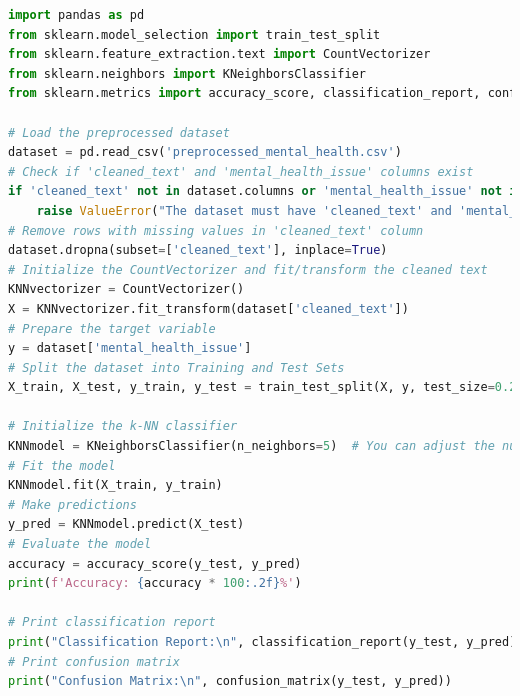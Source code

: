 \begin{tcolorbox}[colback=gray!5!white, colframe=gray!80!black, boxrule=0.5pt, title=k-NN Classifier Implementation for Mental Health Classification]
    \begin{lstlisting}[language=Python]
import pandas as pd
from sklearn.model_selection import train_test_split
from sklearn.feature_extraction.text import CountVectorizer
from sklearn.neighbors import KNeighborsClassifier
from sklearn.metrics import accuracy_score, classification_report, confusion_matrix

# Load the preprocessed dataset
dataset = pd.read_csv('preprocessed_mental_health.csv')
# Check if 'cleaned_text' and 'mental_health_issue' columns exist
if 'cleaned_text' not in dataset.columns or 'mental_health_issue' not in dataset.columns:
    raise ValueError("The dataset must have 'cleaned_text' and 'mental_health_issue' columns.")
# Remove rows with missing values in 'cleaned_text' column
dataset.dropna(subset=['cleaned_text'], inplace=True)
# Initialize the CountVectorizer and fit/transform the cleaned text
KNNvectorizer = CountVectorizer()
X = KNNvectorizer.fit_transform(dataset['cleaned_text'])
# Prepare the target variable
y = dataset['mental_health_issue']
# Split the dataset into Training and Test Sets
X_train, X_test, y_train, y_test = train_test_split(X, y, test_size=0.2, random_state=42)

# Initialize the k-NN classifier
KNNmodel = KNeighborsClassifier(n_neighbors=5)  # You can adjust the number of neighbors
# Fit the model
KNNmodel.fit(X_train, y_train)
# Make predictions
y_pred = KNNmodel.predict(X_test)
# Evaluate the model
accuracy = accuracy_score(y_test, y_pred)
print(f'Accuracy: {accuracy * 100:.2f}%')

# Print classification report
print("Classification Report:\n", classification_report(y_test, y_pred))
# Print confusion matrix
print("Confusion Matrix:\n", confusion_matrix(y_test, y_pred))
\end{lstlisting}
\end{tcolorbox}

